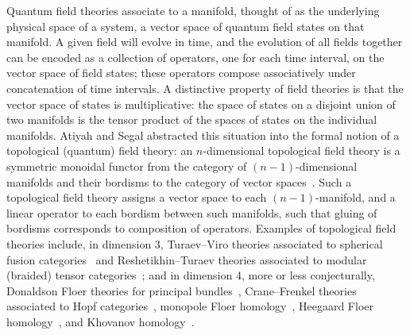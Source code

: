 \documentclass{amsart}
\begin{document}
Quantum field theories associate to a manifold, thought of as the underlying physical space of a system, a vector space of quantum field states on that manifold.  A given field will evolve in time, and the evolution of all fields together can be encoded as a collection of operators, one for each time interval, on the vector space of field states; these operators compose associatively under concatenation of time intervals.  A distinctive property of field theories is that the vector space of states is multiplicative: the space of states on a disjoint union of two manifolds is the tensor product of the spaces of states on the individual manifolds.  Atiyah and Segal abstracted this situation into the formal notion of a topological (quantum) field theory: an $n$-dimensional topological field theory is a symmetric monoidal functor from the category of $(n-1)$-dimensional manifolds and their bordisms to the category of vector spaces~\cite{MR1001453,Segal}.  Such a topological field theory assigns a vector space to each $(n-1)$-manifold, and a linear operator to each bordism between such manifolds, such that gluing of bordisms corresponds to composition of operators.  Examples of topological field theories include, in dimension 3, Turaev--Viro theories associated to spherical fusion categories~\cite{MR1191386, MR1292673} and Reshetikhin--Turaev theories associated to modular (braided) tensor categories~\cite{MR990772,MR1091619}; and in dimension 4, more or less conjecturally, Donaldson Floer theories for principal bundles~\cite{floer,donaldsonym,atiyah88,witten88}, Crane--Frenkel theories associated to Hopf categories~\cite{cranefrenkel}, monopole Floer homology~\cite{kronmrowka}, Heegaard Floer homology~\cite{os04,os06}, and Khovanov homology~\cite{khovanov}.
\end{document}
